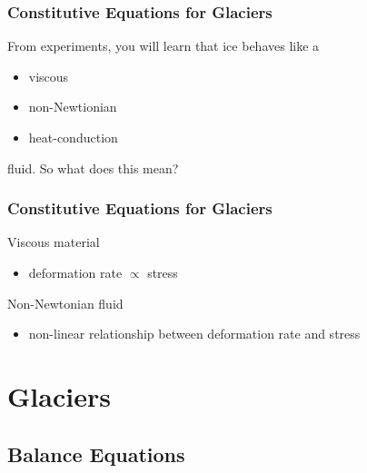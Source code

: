 \documentclass[hide notes,intlimits]{beamer}
\begin{document}
\begin{frame}
  \frametitle{Constitutive Equations for Glaciers}
  From experiments, you will learn that ice behaves like a
  \begin{itemize}
    \item viscous
    \item non-Newtionian
    \item heat-conduction
 \end{itemize}
fluid. So what does this mean?
\end{frame}


\begin{frame}
  \frametitle{Constitutive Equations for Glaciers}
  \begin{block}{Viscous material}
 \begin{itemize}
    \item deformation rate $\propto$ stress
\end{itemize}
 \end{block}
  \begin{block}{Non-Newtonian fluid}
 \begin{itemize}
    \item non-linear relationship between deformation rate and stress
\end{itemize}
 \end{block}
\end{frame}


\section{Glaciers}


\subsection{Balance Equations}

\end{document}

